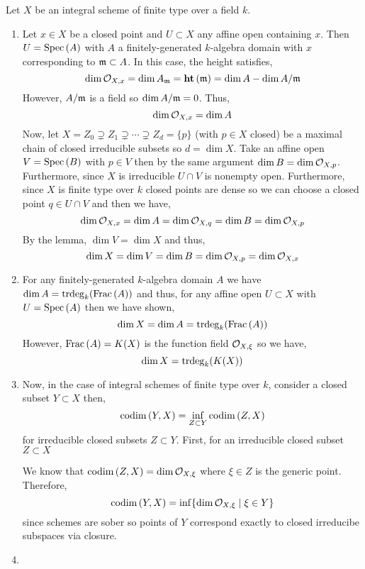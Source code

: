\documentclass[12pt]{article}
\begin{document}
Let $X$ be an integral scheme of finite type over a field $k$.
\begin{enumerate}
\item Let $x \in X$ be a closed point and $U \subset X$ any affine open containing $x$. Then $U = \mathrm{Spec}\left( A \right)$ with $A$ a finitely-generated $k$-algebra domain with $x$ corresponding to $\mathfrak{m} \subset A$. In this case, the height satisfies,
\[ \dim{\mathcal{O}_{X, x}} = \dim{A_{\mathfrak{m}}} = \mathbf{ht}\left( \mathfrak{m} \right) = \dim{A} - \dim{A / \mathfrak{m}} \]
However, $A / \mathfrak{m}$ is a field so $\dim{A / \mathfrak{m}} = 0$. Thus,
\[ \dim{\mathcal{O}_{X, x}} =  \dim{A} \]
Now, let $X = Z_0 \supsetneq Z_1 \supsetneq \cdots \supsetneq Z_d = \{ p \}$ (with $p \in X$ closed) be a maximal chain of closed irreducible subsets so $d = \dim{X}$. Take an affine open $V = \mathrm{Spec}\left( B \right)$ with $p \in V$ then by the same argument $\dim{B} = \dim{\mathcal{O}_{X, p}}$. Furthermore, since $X$ is irreducible $U \cap V$ is nonempty open. Furthermore, since $X$ is finite type over $k$ closed points are dense so we can choose a closed point $q \in U \cap V$ and then we have,
\[ \dim{\mathcal{O}_{X, x}} = \dim{A} = \dim{\mathcal{O}_{X, q}} = \dim{B} = \dim{\mathcal{O}_{X, p}} \]
By the lemma, $\dim{V} = \dim{X}$ and thus,
\[ \dim{X} = \dim{V} = \dim{B} = \dim{\mathcal{O}_{X, p}} =  \dim{\mathcal{O}_{X, x}} \]
\item For any finitely-generated $k$-algebra domain $A$ we have $\dim{A} = \mathrm{trdeg}_{k}(\mathrm{Frac}\left(A\right))$ and thus, for any affine open $U \subset X$ with $U = \mathrm{Spec}\left( A \right)$ then we have shown,
\[ \dim{X} = \dim{A} = \mathrm{trdeg}_{k}(\mathrm{Frac}\left(A\right)) \]
However, $\mathrm{Frac}\left(A\right) = K(X)$ is the function field $\mathcal{O}_{X, \xi}$ so we have,
\[ \dim{X} = \mathrm{trdeg}_{k}(K(X)) \]
\item 
Now, in the case of integral schemes of finite type over $k$, consider a closed subset $Y \subset X$ then,
\[ \mathrm{codim}\left( Y, X \right) = \inf_{Z \subset Y} \mathrm{codim}\left( Z, X \right) \]
for irreducible closed subsets $Z \subset Y$. First, for an irreducible closed subset $Z \subset X$ 

We know that $\mathrm{codim}\left( Z, X \right) = \dim{\mathcal{O}_{X, \xi}}$ where $\xi \in Z$ is the generic point. Therefore, 
\[ \mathrm{codim}\left( Y, X \right) = \inf \{ \dim{\mathcal{O}_{X, \xi}} \mid \xi \in Y \} \]
since schemes are sober so points of $Y$ correspond exactly to closed irreducibe subspaces via closure. 

\item 


\end{enumerate}
\end{document}
